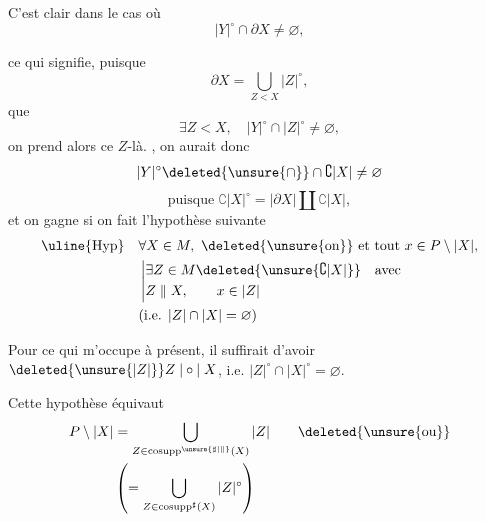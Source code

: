 \clearpage
{}

C'est clair dans le cas où
\[
|Y|^{\circ}\cap\partial X\neq\varnothing,
\]

ce qui signifie, puisque
\[
\partial X=\bigcup_{Z<X}|Z|^{\circ},
\]
que
\[
\exists Z<X,\quad |Y|^{\circ}\cap|Z|^{\circ}\neq\varnothing,
\]
on prend alors ce $Z$-là. , on aurait donc
\[
|Y|^{\circ}\deleted{\unsure{\cap}}\cap\complement|X|\neq\varnothing
\]
\[
\text{puisque }\complement|X|^{\circ}=|\partial X|\amalg\complement|X|,
\]
et on gagne si on fait l'hypothèse suivante
\[
\begin{aligned}
\text{\uline{Hyp}}\quad&\forall X\in M,\ \deleted{\text{\unsure{on}}}\text{ et tout }x\in P\setminus|X|,\\
&\left|\begin{aligned}
&\exists Z\in M\deleted{\unsure{\complement|X|}}\quad\text{avec}\\
&Z\parallel X,\qquad x\in|Z|
\end{aligned}\right.\\
&\text{(i.e. }|Z|\cap|X|=\varnothing\text{)}
\end{aligned}
\]

Pour ce qui m'occupe à présent, il suffirait d'avoir $\deleted{\unsure{|Z|}}Z\mathrel{|\circ|}X$, i.e. $|Z|^{\circ}\cap|X|^{\circ}=\varnothing$.

Cette hypothèse équivaut 
\[
\begin{aligned}
P\setminus|X|&=\bigcup_{Z\in\operatorname{cosupp}^{\unsure{\sharp|\parallel}}(X)}|Z|\qquad\deleted{\unsure{\text{ou}}}\\
&\left(=\bigcup_{Z\in\operatorname{cosupp}^{\sharp}(X)}|Z|^{\circ}\right)
\end{aligned}
\]

